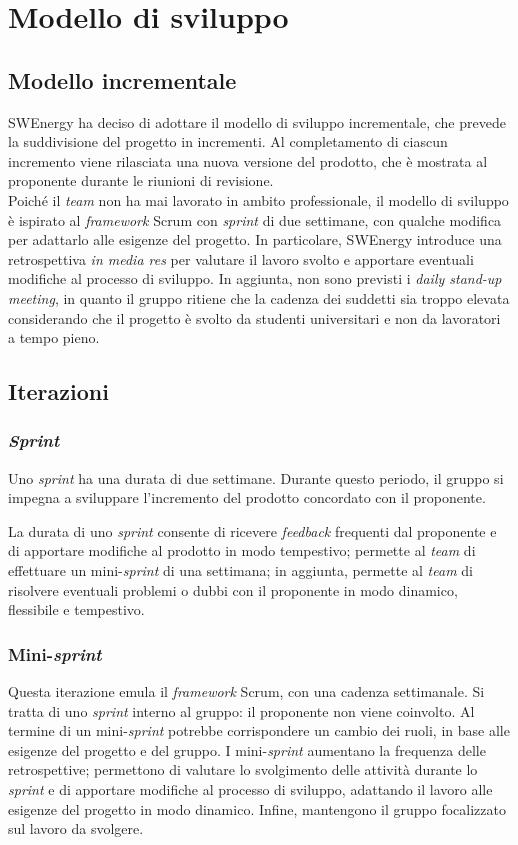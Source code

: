\section{Modello di sviluppo}

\subsection{Modello incrementale}
SWEnergy ha deciso di adottare il modello di sviluppo incrementale, che prevede
la suddivisione del progetto in incrementi. Al completamento di ciascun
incremento viene rilasciata una nuova versione del prodotto, che è mostrata al
proponente durante le riunioni di revisione.\\
Poiché il \textit{team} non ha mai
lavorato in ambito professionale, il modello di sviluppo è ispirato al
\textit{framework} Scrum con \textit{sprint} di due settimane, con qualche
modifica per adattarlo alle esigenze del progetto. In particolare,
SWEnergy introduce una retrospettiva \textit{in media res} per valutare il
lavoro svolto e apportare eventuali modifiche al processo di sviluppo.
In aggiunta, non sono previsti i \textit{daily stand-up meeting}, in quanto il
gruppo ritiene che la cadenza dei suddetti sia troppo elevata considerando
che il progetto è svolto da studenti universitari e non da lavoratori a tempo
pieno.

\subsection{Iterazioni}

\subsubsection{\textit{Sprint}}
Uno \textit{sprint} ha una durata di due settimane. Durante questo periodo, il
gruppo si impegna a sviluppare l'incremento del prodotto concordato con il
proponente.

La durata di uno \textit{sprint}
consente di ricevere \textit{feedback} frequenti dal proponente e di apportare
modifiche al prodotto in modo tempestivo;
permette al \textit{team} di effettuare un mini-\textit{sprint} di una
settimana;
in aggiunta, permette al \textit{team} di risolvere eventuali problemi o dubbi
con il proponente in modo dinamico, flessibile e tempestivo.

\subsubsection{Mini-\textit{sprint}}
Questa iterazione emula il \textit{framework} Scrum, con una cadenza
settimanale. Si tratta di uno \textit{sprint}
interno al gruppo: il proponente non viene coinvolto. Al termine di un
mini-\textit{sprint} potrebbe corrispondere un cambio dei ruoli, in base alle
esigenze del progetto e del gruppo.
I mini-\textit{sprint} aumentano la frequenza delle retrospettive; permettono
di valutare lo svolgimento delle attività durante lo \textit{sprint} e di
apportare modifiche al processo di sviluppo, adattando il lavoro alle esigenze
del progetto in modo dinamico.
Infine, mantengono il gruppo focalizzato sul lavoro da svolgere.

